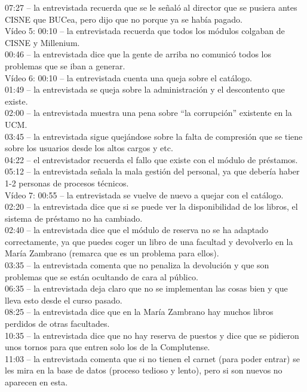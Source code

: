 \documentclass[12pt]{article}
\begin{document}
07:27 – la entrevistada recuerda que se le señaló al director que se pusiera antes CISNE que BUCea, pero dijo que no porque ya se había pagado.\\
Vídeo 5:
00:10 – la entrevistada recuerda que todos los módulos colgaban de CISNE y Millenium.\\
00:46 – la entrevistada dice que la gente de arriba no comunicó todos los problemas que se iban a generar.\\
Vídeo 6:
00:10 – la entrevistada cuenta una queja sobre el catálogo.\\ 
01:49 – la entrevistada se queja sobre la administración y el descontento que existe.\\
02:00 – la entrevistada muestra una pena sobre “la corrupción” existente en la UCM.\\
03:45 – la entrevistada sigue quejándose sobre la falta de compresión que se tiene sobre los usuarios desde los altos cargos y etc.\\
04:22 – el entrevistador recuerda el fallo que existe con el módulo de préstamos.\\
05:12 – la entrevistada señala la mala gestión del personal, ya que debería haber 1-2 personas de procesos técnicos.\\
Vídeo 7: 
00:55 – la entrevistada se vuelve de nuevo a quejar con el catálogo.\\
02:20 – la entrevistada dice que si se puede ver la disponibilidad de los libros, el sistema de préstamo no ha cambiado.\\
02:40 – la entrevistada dice que el módulo de reserva no se ha adaptado correctamente, ya que puedes coger un libro de una facultad y devolverlo en la María Zambrano (remarca que es un problema para ellos).\\
03:35 – la entrevistada comenta que no penaliza la devolución y que son problemas que se están ocultando de cara al público.\\
06:35 – la entrevistada deja claro que no se implementan las cosas bien y que lleva esto desde el curso pasado.\\
08:25 – la entrevistada dice que en la María Zambrano hay muchos libros perdidos de otras facultades.\\
10:35 – la entrevistada dice que no hay reserva de puestos y dice que se pidieron unos tornos para que entren solo los de la Complutense.\\
11:03 – la entrevistada comenta que si no tienen el carnet (para poder entrar) se les mira en la base de datos (proceso tedioso y lento), pero si son nuevos no aparecen en esta.\\
\end{document}
